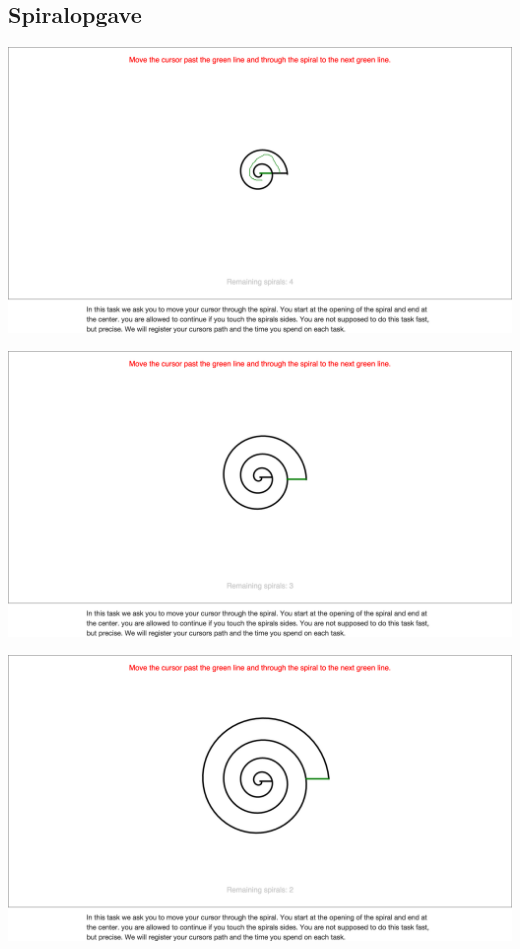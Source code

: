 \subsection*{Spiralopgave}
\begin{minipage}{\textwidth}
	\begin{minipage}{.5\textwidth}
		\centering
		\includegraphics[width=\textwidth, trim = 5cm 14cm 5cm 8cm, clip]{images/screenshots/ex_step_5_spiral_path}
		\label{fig:ex_spiral_1}
	\end{minipage}
	\begin{minipage}{.5\textwidth}
		\centering
		\includegraphics[width=\textwidth, trim = 5cm 14cm 5cm 8cm, clip]{images/screenshots/ex_step_5_spiral_2}
		\label{fig:ex_spiral_2}
	\end{minipage}
	\begin{minipage}{.5\textwidth}
		\centering
		\includegraphics[width=\textwidth, trim = 5cm 14cm 5cm 8cm, clip]{images/screenshots/ex_step_5_spiral_3}

\end{minipage}
\end{minipage}
